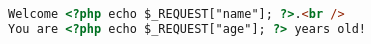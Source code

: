 \begin{lstlisting}[language=HTML]
Welcome <?php echo $_REQUEST["name"]; ?>.<br />
You are <?php echo $_REQUEST["age"]; ?> years old!
\end{lstlisting}

























































